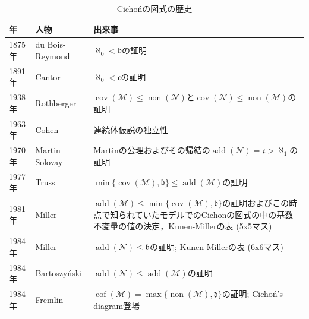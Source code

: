\documentclass[uplatex,dvipdfmx]{jsarticle}
\newcommand{\non}{\operatorname{non}}
\newcommand{\cov}{\operatorname{cov}}
\newcommand{\add}{\operatorname{add}}
\newcommand{\cof}{\operatorname{cof}}
\newcommand{\nul}{\mathcal{N}}
\newcommand{\meager}{\mathcal{M}}
\newcommand{\frakc}{\mathfrak{c}}
\newcommand{\frakb}{\mathfrak{b}}
\newcommand{\frakd}{\mathfrak{d}}
\theoremstyle{definition}
\begin{document}
	\begin{table}[h]\label{table:history}
		\caption{Cichońの図式の歴史}
			\begin{tabular}{@{} l|l|p{8cm}}
			年     & 人物                                & 出来事                                                                                                                                                       \\ \hline
			1875年 & du Bois-Reymond & $\aleph_0 < \frakb$の証明 \\ \hline
			1891年 & Cantor & $\aleph_0 < \frakc$の証明 \\ \hline
			1938年 & Rothberger                        & $\cov(\meager) \le \non(\nul)$と$\cov(\nul)\le\non(\meager)$の証明                                                                                            \\ \hline
			1963年 & Cohen                             & 連続体仮説の独立性                                                                                                                                                 \\ \hline
			1970年 & Martin--Solovay                   & Martinの公理およびその帰結の$\add(\nul)=\frakc>\aleph_1$の証明                                                                                                           \\ \hline
			1977年 & Truss                             & $\min\{\cov(\meager), \frakb\} \le \add(\meager)$の証明                                                                                                       \\ \hline
			1981年 & Miller                            & $\add(\meager) \le \min\{\cov(\meager), \frakb\}$の証明およびこの時点で知られていたモデルでのCichonの図式の中の基数不変量の値の決定，Kunen-Millerの表 (5x5マス) \\ \hline
			1984年 & Miller                            & $\add(\nul) \le \frakb$の証明; Kunen-Millerの表 (6x6マス)                                                                                                        \\ \hline
			1984年 & Bartoszyński                      & $\add(\nul) \le \add(\meager)$の証明                                                                                                                         \\ \hline
			1984年 & Fremlin                      & $\cof(\meager) = \max\{\non(\meager), \frakd\}$の証明; Cichoń's diagram登場                                                                                                                     \\ \hline

\end{tabular}
\end{table}
\end{document}
